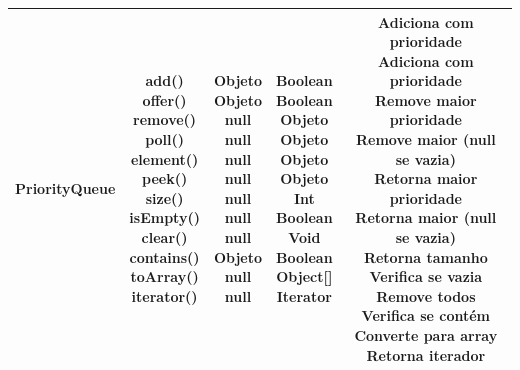 \documentclass[a4paper,10pt]{article}
\begin{document}
\begin{center}
\begin{longtable}{ |l|c|c|c|c| }
        \textbf{PriorityQueue} & \makecell{ add() \\ offer() \\ remove() \\ poll() \\ element() \\ peek() \\ size() \\ isEmpty() \\ clear() \\ contains() \\ toArray() \\ iterator()} & \makecell{Objeto \\ Objeto \\ null \\ null \\ null \\ null \\ null \\ null \\ null \\ Objeto \\ null \\ null} & \makecell{Boolean \\ Boolean \\ Objeto \\ Objeto \\ Objeto \\ Objeto \\ Int \\ Boolean \\ Void \\ Boolean \\ Object[] \\ Iterator} & \makecell{Adiciona com prioridade \\ Adiciona com prioridade \\ Remove maior prioridade \\ Remove maior (null se vazia) \\ Retorna maior prioridade \\ Retorna maior (null se vazia) \\ Retorna tamanho \\ Verifica se vazia \\ Remove todos \\ Verifica se contém \\ Converte para array \\ Retorna iterador} \\ \hline


\end{longtable}
\end{center}
\end{document}
